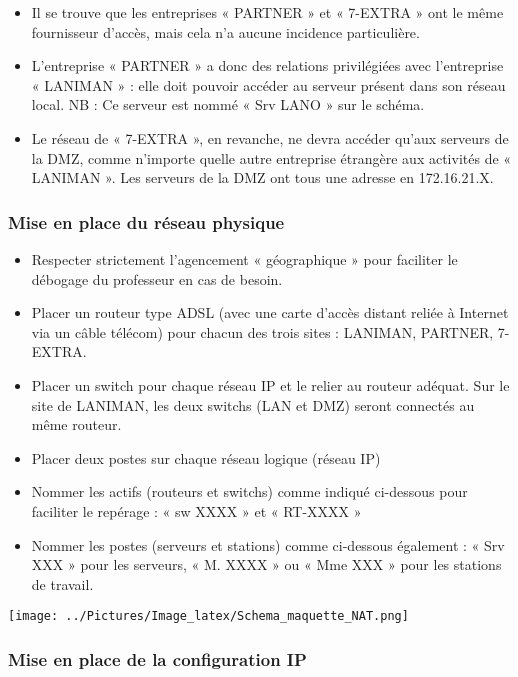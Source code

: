 \documentclass[10pt,a4paper]{article}
\begin{document}
\begin{itemize}
\bigbreak
\item Il se trouve que les entreprises « PARTNER » et « 7-EXTRA » ont le même fournisseur d’accès, mais cela n’a aucune incidence particulière.
\bigbreak
\item L’entreprise « PARTNER » a donc des relations privilégiées avec l’entreprise « LANIMAN » : elle doit pouvoir accéder au serveur présent dans son réseau local.	
NB : Ce serveur est nommé « Srv LANO » sur le schéma.
\bigbreak
\item Le réseau de « 7-EXTRA », en revanche, ne devra accéder qu’aux serveurs de la DMZ, comme n’importe quelle autre entreprise étrangère aux activités de « LANIMAN ». Les serveurs de la DMZ ont tous une adresse en 172.16.21.X.

\end{itemize}
\subsubsection{Mise en place du réseau physique}
\begin{itemize}
\item Respecter strictement l’agencement « géographique » pour faciliter le débogage du professeur en cas de besoin.
\bigbreak
\item Placer un routeur type ADSL (avec une carte d’accès distant reliée à Internet via un câble télécom) pour chacun des trois sites : LANIMAN, PARTNER, 7-EXTRA.
\bigbreak
\item Placer un switch pour chaque réseau IP et le relier au routeur adéquat. Sur le site de LANIMAN, les deux switchs (LAN et DMZ) seront connectés au même routeur.
\bigbreak
\item Placer deux postes sur chaque réseau logique (réseau IP)
\bigbreak
\item Nommer les actifs (routeurs et switchs) comme indiqué ci-dessous pour faciliter le repérage : « sw XXXX » et « RT-XXXX »
\bigbreak
\item Nommer les postes (serveurs et stations) comme ci-dessous également : « Srv XXX » pour les serveurs, « M. XXXX » ou « Mme XXX » pour les stations de travail.
\end{itemize}
\bigbreak
\center
\texttt{[image: ../Pictures/Image\_latex/Schema\_maquette\_NAT.png]} 
\endcenter
\newpage
\subsubsection{Mise en place de la configuration IP}
\end{document}
